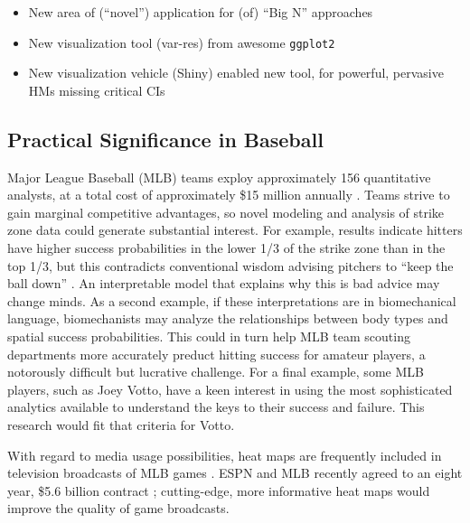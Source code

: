 
\begin{itemize}
\item New area of (``novel'') application for (of) ``Big N'' approaches
\item New visualization tool (var-res) from awesome \verb|ggplot2|
\item New visualization vehicle (Shiny) enabled new tool, for powerful, pervasive HMs missing critical CIs
\end{itemize}

\subsection{Practical Significance in Baseball}

Major League Baseball (MLB\textsuperscript{\textregistered}) teams exploy approximately 156 quantitative analysts, at a total cost of approximately \$15 million annually \citep{Lindbergh2016}. Teams strive to gain marginal competitive advantages, so novel modeling and analysis of strike zone data could generate substantial interest. For example, results indicate hitters have higher success probabilities in the lower 1/3 of the strike zone than in the top 1/3, but this contradicts conventional wisdom advising pitchers to ``keep the ball down'' \citep{Stallings2003}. An interpretable model that explains why this is bad advice may change minds. As a second example, if these interpretations are in biomechanical language, biomechanists may analyze the relationships between body types and spatial success probabilities. This could in turn help MLB\textsuperscript{\textregistered} team scouting departments more accurately preduct hitting success for amateur players, a notorously difficult but lucrative challenge. For a final example, some MLB\textsuperscript{\textregistered} players, such as Joey Votto, have a keen interest in using the most sophisticated analytics available to understand the keys to their success and failure\citep{Daugherty2015}. This research would fit that criteria for Votto.

With regard to media usage possibilities, heat maps are frequently included in television broadcasts of MLB\textsuperscript{\textregistered} games \citep{Cross2015}. ESPN\textsuperscript{\textregistered} and MLB\textsuperscript{\textregistered} recently agreed to an eight year, \$5.6 billion contract \citep{Newman2012}; cutting-edge, more informative heat maps would improve the quality of game broadcasts.

